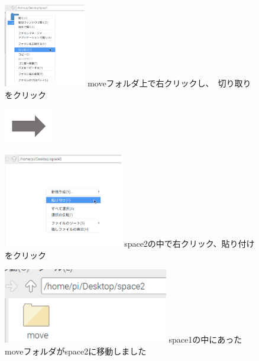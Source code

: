 \documentclass[a4paper,12pt]{jarticle}
\begin{document}
\begin{figure}[ht]
  \centering
  \begin{minipage}{6.589cm}
    \includegraphics[width=3.584cm,height=3.658cm]{textbook-img048.png}
    {
      moveフォルダ上で右クリックし、　切り取りをクリック
    }
  \end{minipage}
  \includegraphics[width=2.168cm,height=1.542cm]{textbook-img049.png}
  \begin{minipage}{6.589cm}
    \includegraphics[width=5.225cm,height=4.119cm]{textbook-img046.png}
    {
      space2の中で右クリック、貼り付けをクリック
    }
  \end{minipage}

  \begin{minipage}{6.589cm}
    \includegraphics[width=7.218cm,height=3.281cm]{textbook-img045.png}
    {
      space1の中にあったmoveフォルダがspace2に移動しました
    }
  \end{minipage}


\end{figure}
\end{document}
